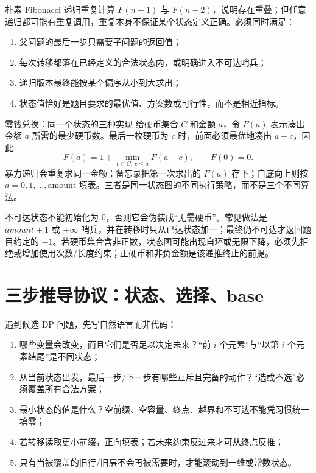 \documentclass[UTF8,fontset=none,11pt,a4paper]{ctexart}
\begin{document}
朴素 Fibonacci 递归重复计算 $F(n-1)$ 与 $F(n-2)$，说明存在重叠；但任意递归都可能有重复调用，重复本身不保证某个状态定义正确。必须同时满足：
\begin{enumerate}
\item {}父问题的最后一步只需要子问题的返回值；
\item {}每次转移都落在已经定义的合法状态内，或明确进入不可达哨兵；
\item {}递归版本最终能按某个偏序从小到大求出；
\item {}状态值恰好是题目要求的最优值、方案数或可行性，而不是相近指标。
\end{enumerate}

\begin{examplebox}{零钱兑换：同一个状态的三种实现}
给硬币集合 $C$ 和金额 $a$，令 $F(a)$ 表示凑出金额 $a$ 所需的最少硬币数。最后一枚硬币为 $c$ 时，前面必须最优地凑出 $a-c$，因此
\[
F(a)=1+\min_{c\in C,\ c\le a}F(a-c),\qquad F(0)=0.
\]
暴力递归会重复求同一金额；备忘录把第一次求出的 $F(a)$ 存下；自底向上则按 $a=0,1,\ldots,\text{amount}$ 填表。三者是同一状态图的不同执行策略，而不是三个不同算法。
\end{examplebox}

不可达状态不能初始化为 $0$，否则它会伪装成“无需硬币”。常见做法是 $amount+1$ 或 $+\infty$ 哨兵，并在转移时只从已达状态加一；最终仍不可达才返回题目约定的 $-1$。若硬币集合含非正数，状态图可能出现自环或无限下降，必须先拒绝或增加使用次数/长度约束；正硬币和非负金额是该递推终止的前提。

\section{三步推导协议：状态、选择、base}

遇到候选 DP 问题，先写自然语言而非代码：
\begin{enumerate}
\item {}哪些变量会改变，而且它们是否足以决定未来？“前 $i$ 个元素”与“以第 $i$ 个元素结尾”是不同状态；
\item {}从当前状态出发，最后一步/下一步有哪些互斥且完备的动作？“选或不选”必须覆盖所有合法方案；
\item {}最小状态的值是什么？空前缀、空容量、终点、越界和不可达不能凭习惯统一填零；
\item {}若转移读取更小前缀，正向填表；若未来约束反过来才可从终点反推；
\item {}只有当被覆盖的旧行/旧层不会再被需要时，才能滚动到一维或常数状态。
\end{enumerate}
\end{document}
